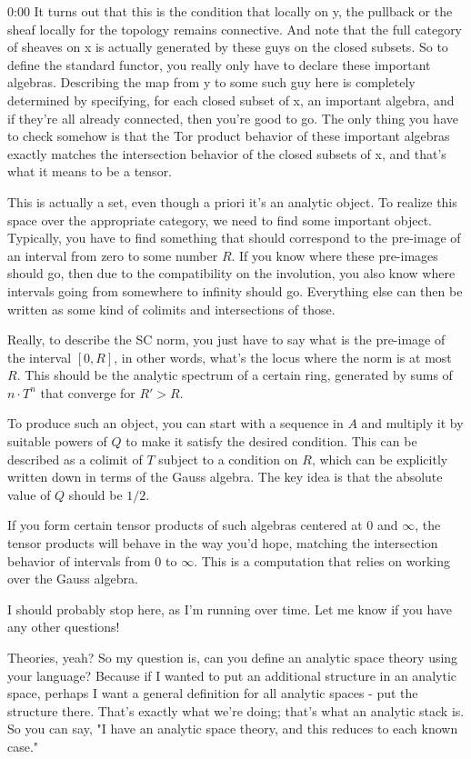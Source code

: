 \begin{unfinished}{0:00}
It turns out that this is the condition that locally on y, the pullback or the sheaf locally for the topology remains connective. And note that the full category of sheaves on x is actually generated by these guys on the closed subsets. So to define the standard functor, you really only have to declare these important algebras. Describing the map from y to some such guy here is completely determined by specifying, for each closed subset of x, an important algebra, and if they're all already connected, then you're good to go. The only thing you have to check somehow is that the Tor product behavior of these important algebras exactly matches the intersection behavior of the closed subsets of x, and that's what it means to be a tensor.

This is actually a set, even though a priori it's an analytic object. To realize this space over the appropriate category, we need to find some important object. Typically, you have to find something that should correspond to the pre-image of an interval from zero to some number $R$. If you know where these pre-images should go, then due to the compatibility on the involution, you also know where intervals going from somewhere to infinity should go. Everything else can then be written as some kind of colimits and intersections of those.

Really, to describe the SC norm, you just have to say what is the pre-image of the interval $[0, R]$, in other words, what's the locus where the norm is at most $R$. This should be the analytic spectrum of a certain ring, generated by sums of $n \cdot T^n$ that converge for $R' > R$. 

To produce such an object, you can start with a sequence in $A$ and multiply it by suitable powers of $Q$ to make it satisfy the desired condition. This can be described as a colimit of $T$ subject to a condition on $R$, which can be explicitly written down in terms of the Gauss algebra. The key idea is that the absolute value of $Q$ should be $1/2$.

If you form certain tensor products of such algebras centered at 0 and $\infty$, the tensor products will behave in the way you'd hope, matching the intersection behavior of intervals from 0 to $\infty$. This is a computation that relies on working over the Gauss algebra.

I should probably stop here, as I'm running over time. Let me know if you have any other questions!

Theories, yeah? So my question is, can you define an analytic space theory using your language? Because if I wanted to put an additional structure in an analytic space, perhaps I want a general definition for all analytic spaces - put the structure there. That's exactly what we're doing; that's what an analytic stack is. So you can say, "I have an analytic space theory, and this reduces to each known case."


\end{unfinished}
